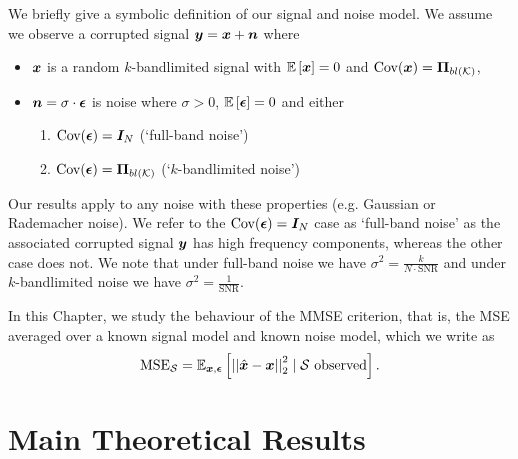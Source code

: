 We briefly give a symbolic definition of our signal and noise model. We assume we observe a corrupted signal $\bm{y} = \bm{x} + \bm{n}$ %
where
\begin{itemize}
    \item $\bm{x}$ is a random $k$-bandlimited signal with $\expect{\vect{x}} = 0$ and $\text{Cov}(\vect{x}) = \projbl$,
    \item $\bm{n} = \sigma \cdot \bm{\epsilon}$ is noise where $\sigma > 0$, $\expect{\vect{\epsilon}} = 0$ and either
    {\color{black}
    \begin{enumerate}
        \item $\text{Cov}(\bm{\epsilon}) = \bm{I}_{N}$ (`full-band noise')
        \item $\text{Cov}(\vect{\epsilon}) = \projbl $  (`$k$-bandlimited noise')
    \end{enumerate}
    }
\end{itemize}
Our results apply to any noise with these properties (e.g. Gaussian or Rademacher noise).
We refer to the $\text{Cov}(\bm{\epsilon}) = \bm{I}_{N}$ case as `full-band noise' as the associated corrupted signal $\bm{y}$ has high frequency components, whereas the other case does not. %
We note that under full-band noise we have $\sigma^{2} = \frac{k}{N \cdot \text{SNR}}$ and under $k$-bandlimited noise we have $\sigma^{2} = \frac{1}{\text{SNR}}$.


In this Chapter, we study the behaviour of the MMSE criterion, that is, the MSE averaged over a known signal model and known noise model, which we write as
\begin{equation}
    \textrm{MSE}_{\set{S}} = \expect[\vect{x},\vect{\epsilon}]{\sqnormvec{\hat{\vect{x}} - \vect{x}} \smallskip \mid \set{S} \textrm{ observed} }.
\end{equation}

\section{Main {\color{black}Theoretical} Results}
\label{main_results_sec}

